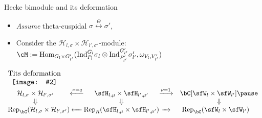 \documentclass[t,mathserif,11pt,usenames,dvipsnames]{beamer}
\theoremstyle{plain}
\theoremstyle{definition}
\def\Hom{{\rm Hom}}
\def\Ind{{\rm Ind}}
\def\Hom{{\mathrm{Hom}}}
\def\Rep{{\mathrm{Rep}}}
\def\half{{\frac{1}{2}}}
\def\blue{\color{blue}}
\let\oldemph\emph
\def\emph#1{\oldemph{\blue #1}}
\def\hhgraph#1#2#3{\ensuremath{\begin{array}{c}\text{#3}\\
        \hbox{\texttt{[image: \#2]}}
        \end{array}}}
\def\sH{\mathcal{H}}
\def\cH{\mathcal{H}}
\begin{document}
\begin{frame}{Hecke bimodule and its deformation}
  \begin{itemize}
    \item[] \emph{Assume} theta-cuspidal
          $\sigma\stackrel{\Theta}{\longleftrightarrow}\sigma'$, \pause
    \item Consider the $\cH_{l,\sigma}\times \cH_{l',\sigma'}$-module:
          $\cM:= \Hom_{G_l\times G'_{l'}}(\Ind_{P_{l}}^{G_{l}}\sigma_l\otimes \Ind_{P'_{l'}}^{G'_{l'}}\sigma'_{l'}, \omega_{V_l,V'_{l'}})$ \pause
  \end{itemize}
  $ \hhgraph{0.10\textwidth}{Tits}{Tits deformation}$ \\ %
  $\begin{array}{ccccc}
     \sH_{l,\sigma}\times \sH_{l',\sigma'}& \xleftarrow{\nu=q}& \sfH_{l,\mu} \times \sfH_{l',\mu'} & \xrightarrow{\nu=1}&\bC[\sfW_{l}\times \sfW_{l'}]\pause\\
     \Downarrow & & \Downarrow & & \Downarrow\\
     \Rep_{\bC}(\sH_{l,\sigma}\times \sH_{l',\sigma'})\hspace{-1em} & \xleftarrow{ \ \ \ } &\hspace{-1em} \Rep_{R}(\sfH_{l,\mu}\times\sfH_{l',\mu'})\hspace{-1em} & \xrightarrow{\ \ }& \hspace{-1em}\Rep_{\bC}(\sfW_{l}\times\sfW_{l'})\\
   \end{array}
   $
 \end{frame}
\end{document}

